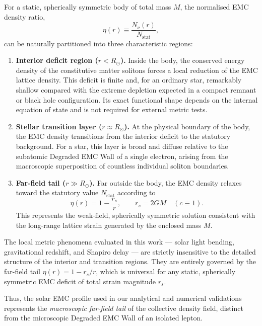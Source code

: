 \documentclass[10pt,a4paper]{article}
\begin{document}
For a static, spherically symmetric body of total mass \(M\), the
normalised EMC density ratio,
\begin{equation}
	\eta(r) \equiv \frac{N_\nu(r)}{N_{\text{stat}}},
\end{equation}
can be naturally partitioned into three characteristic regions:
\begin{enumerate}
	\item \textbf{Interior deficit region ($r < R_\odot$).} Inside the body, the
	conserved energy density of the constitutive matter solitons forces a local
	reduction of the EMC lattice density. This deficit is finite and, for an
	ordinary star, remarkably shallow compared with the extreme depletion
	expected in a compact remnant or black hole configuration.
	Its exact functional shape depends on the internal equation of state and is
	not required for external metric tests.
	
	\item \textbf{Stellar transition layer ($r \approx R_\odot$).} At the physical boundary of the body, the
	EMC density transitions from the interior deficit to the statutory
	background. For a star, this layer is broad and diffuse relative to the 
	subatomic Degraded EMC Wall of a single electron, arising from the macroscopic 
	superposition of countless individual soliton boundaries.
	
	\item \textbf{Far-field tail ($r \gg R_\odot$).} Far outside the body, the EMC
	density relaxes toward the statutory value \(N_{\text{stat}}\) according to
	\begin{equation}
		\eta(r)
		=
		1 - \frac{r_s}{r},
		\qquad
		r_s = 2GM \quad (c \equiv 1).
		\label{eq:emc_far_field_tail}
	\end{equation}
	This represents the weak-field, spherically symmetric solution consistent with 
	the long-range lattice strain generated by the enclosed mass $M$.
\end{enumerate}

The local metric phenomena evaluated in this work --- solar light bending,
gravitational redshift, and Shapiro delay --- are strictly insensitive to the
detailed structure of the interior and transition regions. They are entirely
governed by the far-field tail \(\eta(r)=1-r_s/r\), which is universal for any 
static, spherically symmetric EMC deficit of total strain magnitude \(r_s\).

Thus, the solar EMC profile used in our analytical and numerical validations represents the
\emph{macroscopic far-field tail} of the collective density field, distinct from the 
microscopic Degraded EMC Wall of an isolated lepton.
\end{document}
